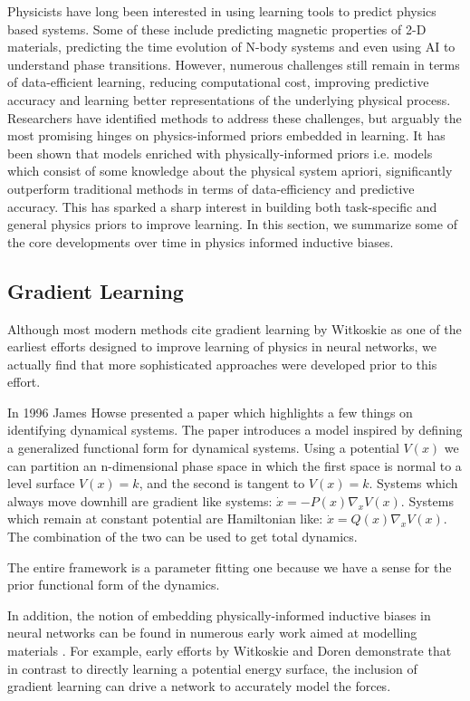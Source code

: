 \documentclass{article}
\begin{document}
Physicists have long been interested in using learning tools to predict physics based systems. Some of these include predicting magnetic properties of 2-D materials, predicting the time evolution of N-body systems and even using AI to understand phase transitions. However, numerous challenges still remain in terms of data-efficient learning, reducing computational cost, improving predictive accuracy and learning better representations of the underlying physical process. Researchers have identified methods to address these challenges, but arguably the most promising hinges on physics-informed priors embedded in learning. It has been shown that models enriched with physically-informed priors i.e. models which consist of some knowledge about the physical system apriori, significantly outperform traditional methods in terms of data-efficiency and predictive accuracy. This has sparked a sharp interest in building both task-specific and general physics priors to improve learning. In this section, we summarize some of the core developments over time in physics informed inductive biases. 

\subsection{Gradient Learning}

Although most modern methods cite gradient learning by Witkoskie \cite{witkoskie_neural_2005} as one of the earliest efforts designed to improve learning of physics in neural networks, we actually find that more sophisticated approaches were developed prior to this effort.

In 1996 James Howse \cite{howse_gradient_1996} presented a paper which highlights a few things on identifying dynamical systems. The paper introduces a model inspired by defining a generalized functional form for dynamical systems. Using a potential $V(x)$ we can partition an n-dimensional phase space in which the first space is normal to a level surface $V(x)=k$, and the second is tangent to $V(x)=k$. Systems which always move downhill are gradient like systems: $ \dot{x} = - P(x)\nabla_{x} V(x) $. Systems which remain at constant potential are Hamiltonian like: $\dot{x} = Q(x)\nabla_x V(x)$. The combination of the two can  be used to get total dynamics.

The entire framework is a parameter fitting one because we have a sense for the prior functional form of the dynamics.

In addition, the notion of embedding physically-informed inductive biases in neural networks can be found in numerous early work aimed at modelling materials \cite{witkoskie_neural_2005, pukrittayakamee_simultaneous_2009, smith_ani-1_2017, rupp_fast_2012, yao_tensormol-01_2018}. For example, early efforts by Witkoskie and Doren \cite{witkoskie_neural_2005} demonstrate that in contrast to directly learning a potential energy surface, the inclusion of gradient learning can drive a network to accurately model the forces. 
\end{document}
